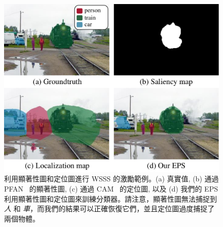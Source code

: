 \begin{figure}[t]
\centering
\includegraphics[width=8 cm]{figures/fig_concept.pdf}
\caption{利用顯著性圖和定位圖進行 WSSS 的激勵範例。(a) 真實值, (b) 通過 PFAN~\cite{zhao2019pyramid} 的顯著性圖, (c) 通過 CAM~\cite{zhou2016learning} 的定位圖, 以及 (d) 我們的 EPS 利用顯著性圖和定位圖來訓練分類器。請注意，顯著性圖無法捕捉到 \emph{人} 和 \emph{車}，而我們的結果可以正確恢復它們，並且定位圖過度捕捉了兩個物體。} \vspace{-2mm}
\label{fig:concept}
\end{figure}
